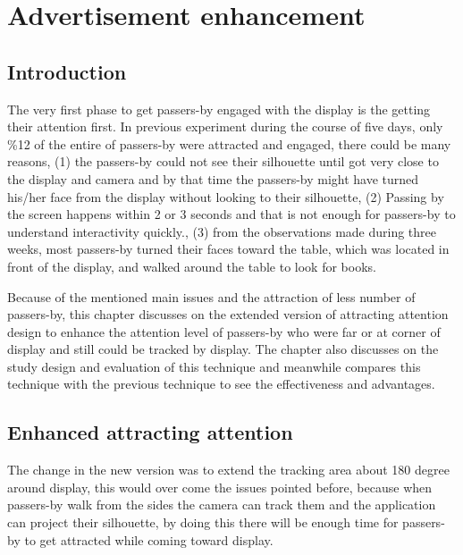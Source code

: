 \chapter{Advertisement enhancement} %

\label{Chapter9} %
\newpage






\section{Introduction}

The very first phase to get passers-by engaged with the display is the getting their attention first. In previous experiment during the course of five days, only \%12 of the entire of passers-by were attracted and engaged, there could be many reasons, (1) the passers-by could not see their silhouette until got very close to the display and camera and by that time the passers-by might have turned his/her face from the display without looking to their silhouette, (2) Passing by the screen happens within 2 or 3 seconds and that is not enough for passers-by to understand interactivity quickly., (3) from the observations made during three weeks, most passers-by turned their faces toward the table, which was located in front of the display, and walked around the table to look for books. 

Because of the mentioned main issues and the attraction of less number of passers-by, this chapter discusses on the extended version of attracting attention design to enhance the attention level of passers-by who were far or at corner of display and still could be tracked by display. The chapter also discusses on the study design and evaluation of this technique and meanwhile compares this technique with the previous technique to see the effectiveness and advantages.




\section{Enhanced attracting attention}
The change in the new version was to extend the tracking area about 180 degree around display, this would over come the issues pointed before, because when passers-by walk from the sides the camera can track them and the application can project their silhouette, by doing this there will be enough time for passers-by to get attracted while coming toward display.

